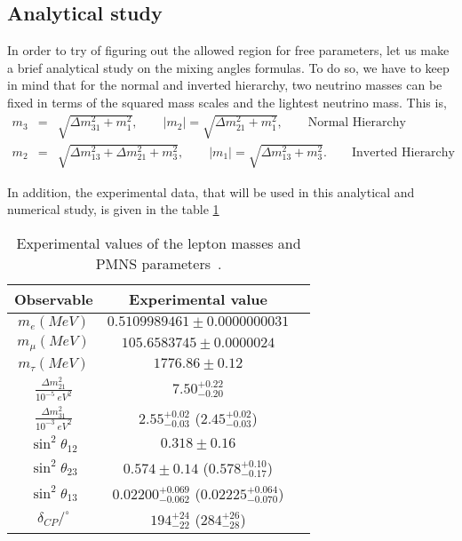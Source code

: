 \documentclass[aps,prd,groupaddress,floatfix,tighten,nofootinbib,showpacs,amsfonts,superscriptaddress]{revtex4-2}
\newcommand{\nn}{\nonumber}
\begin{document}
\subsection{Analytical study}

In order to try of figuring out the allowed region for free parameters, let us make a brief analytical study on the mixing angles formulas. To do so, we have to keep in mind that for the normal and inverted hierarchy, two neutrino masses can be fixed in terms of the squared mass scales and the lightest neutrino mass. This is,
\begin{eqnarray}\label{massfix}
m_{3}&=&\sqrt{\Delta m^{2}_{31}+m^{2}_{1}},\qquad \vert m_{2}\vert=\sqrt{\Delta m^{2
	}_{21}+m^{2}_{1}},\qquad \textrm{Normal Hierarchy}\nn\\
m_{2}&=&\sqrt{\Delta m^{2}_{13}+\Delta m^{2}_{21}+m^{2}_{3}},\qquad \vert m_{1}\vert =\sqrt{\Delta m^{2
	}_{13}+m^{2}_{3}}.\qquad \textrm{Inverted Hierarchy}
\end{eqnarray}

In addition, the experimental data, that will be used in this analytical and numerical study, is given in the table \ref{Tabpdga}

\begin{table}[th]
	\begin{center}
		\begin{tabular}{|c|c|c|}
			\hline\hline
			Observable & Experimental value \\ \hline
			$m_{e}(MeV)$ & \quad $0.5109989461 \pm 0.0000000031$ \\ \hline
			$m_{\mu}(MeV)$ &  \quad $ 105.6583745 \pm 0.0000024$ \\ \hline
			$m_{\tau}(MeV)$ &  \quad $1776.86 \pm 0.12$ \\ \hline
			$\frac{\Delta m^{2}_{21}}{10^{-5}~eV^{2}}$ & \quad $7.50_{-0.20}^{+0.22}$ \\ \hline
			$\frac{\Delta m^{2}_{31}}{10^{-3}~eV^{2}}$ & \quad $2.55_{-0.03}^{+0.02}$ \quad ($2.45_{-0.03}^{+0.02}$) \\ \hline
			$\sin^{2}{\theta}_{12}$ & \quad $0.318 \pm 0.16 $ \\ \hline
			$\sin^{2}{\theta}_{23}$ &  \quad $0.574 \pm 0.14  $ ($0.578^{+0.10}_{-0.17}$)\\ \hline
			$\sin^{2}{\theta}_{13}$ & \quad $0.02200^{+0.069}_{-0.062}$ ($0.02225^{+0.064}_{-0.070}$)\\ \hline
			$\delta_{CP}/^{\circ}$ & \quad $ 194^{+24}_{-22}$ ($ 284^{+26}_{-28}$) \\ \hline\hline
		\end{tabular}%
	\end{center}
	\caption{Experimental values of the lepton masses and PMNS parameters~\cite{deSalas:2020pgw, Zyla:2020zbs}.}
	\label{Tabpdga}
\end{table}
\end{document}
